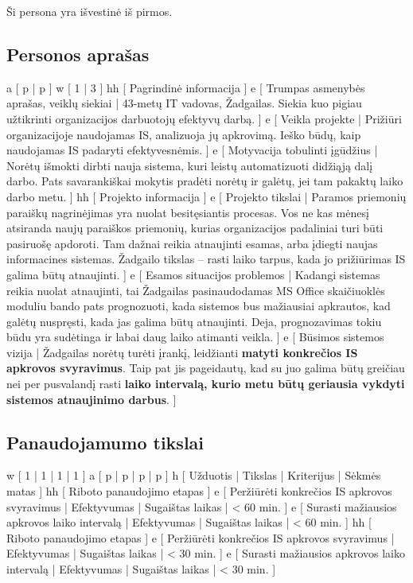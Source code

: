 ﻿Ši persona yra išvestinė iš pirmos.
\subsection{Personos aprašas}
\xtableu
{
  a [ p | p ]
  w [ 1 | 3 ]
  hh [ Pagrindinė informacija ]
  e [ Trumpas asmenybės aprašas, veiklų siekiai 
  | 
    43-metų IT vadovas, Žadgailas. Siekia kuo pigiau užtikrinti
    organizacijos darbuotojų efektyvų darbą.
  ]
  e [ Veikla projekte 
  | 
    Prižiūri organizacijoje naudojamas IS, analizuoja jų apkrovimą.
    Ieško būdų, kaip naudojamas IS padaryti efektyvesnėmis.
  ]
  e [ Motyvacija tobulinti įgūdžius 
  |
    Norėtų išmokti dirbti nauja sistema, kuri leistų automatizuoti
    didžiąją dalį darbo. Pats savarankiškai mokytis pradėti
    norėtų ir galėtų, jei tam pakaktų laiko darbo metu.
  ]
  hh [ Projekto informacija ]
  e [ Projekto tikslai 
  | 
    Paramos priemonių paraiškų nagrinėjimas yra nuolat
    besitęsiantis procesas. Vos ne kas mėnesį atsiranda naujų
    paraiškos priemonių, kurias organizacijos padaliniai turi būti
    pasiruošę apdoroti. Tam dažnai reikia atnaujinti esamas, arba
    įdiegti naujas informacines sistemas. Žadgailo tikslas – rasti
    laiko tarpus, kada jo prižiūrimas IS galima būtų atnaujinti.
  ]
  e [ Esamos situacijos problemos 
  | 
    Kadangi sistemas reikia nuolat atnaujinti, tai Žadgailas
    pasinaudodamas MS Office skaičiuoklės moduliu bando pats
    prognozuoti, kada sistemos bus mažiausiai apkrautos, kad galėtų
    nuspręsti, kada jas galima būtų atnaujinti. Deja, prognozavimas
    tokiu būdu yra sudėtinga ir labai daug laiko atimanti veikla.
  ]
  e [ Būsimos sistemos vizija 
  | 
    Žadgailas norėtų turėti įrankį, leidžianti \textbf{matyti konkrečios
    IS apkrovos svyravimus}. Taip pat jis pageidautų, kad su juo
    galima būtų greičiau nei per pusvalandį rasti \textbf{laiko intervalą,
    kurio metu būtų geriausia vykdyti sistemos atnaujinimo darbus}.
  ]
}

\subsection{Panaudojamumo tikslai}
\xtable
{
  w [ 1 | 1 | 1 | 1 ]
  a [ p | p | p | p ]
  h [ Užduotis | Tikslas | Kriterijus | Sėkmės matas ]
  hh [ Riboto panaudojimo etapas ]
  e [ Peržiūrėti konkrečios IS apkrovos svyravimus | Efektyvumas | Sugaištas laikas | < 60 min. ]
  e [ Surasti mažiausios apkrovos laiko intervalą | Efektyvumas | Sugaištas laikas | < 60 min. ]
  hh [ Riboto panaudojimo etapas ]
  e [ Peržiūrėti konkrečios IS apkrovos svyravimus | Efektyvumas | Sugaištas laikas | < 30 min. ]
  e [ Surasti mažiausios apkrovos laiko intervalą | Efektyvumas | Sugaištas laikas | < 30 min. ]
}
